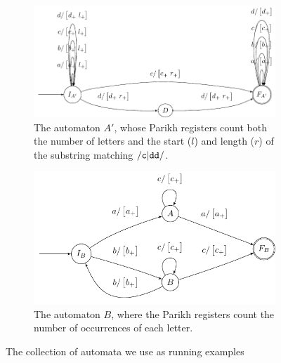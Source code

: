 \begin{figure}[h]
    \centering 
  \begin{subfigure}[b]{0.5\textwidth}
    \centering
    \includegraphics[scale=\autscale]{a}
    \caption{The automaton $A'$, whose Parikh registers count both the number of
    letters and the start ($l$) and length ($r$) of the substring matching
    $\mathtt{\slash c\vert{}dd\slash}$.}\label{fig:aut_a}
  \end{subfigure}
  \begin{subfigure}[b]{0.5\textwidth}
    \centering
    \includegraphics[scale=\autscale]{b}
    \caption{The automaton $B$, where the Parikh registers count the number of
    occurrences of each letter.}\label{fig:aut_b}
  \end{subfigure}
  \caption{The collection of automata we use as running
  examples}\label{fig:examples}
\end{figure}


